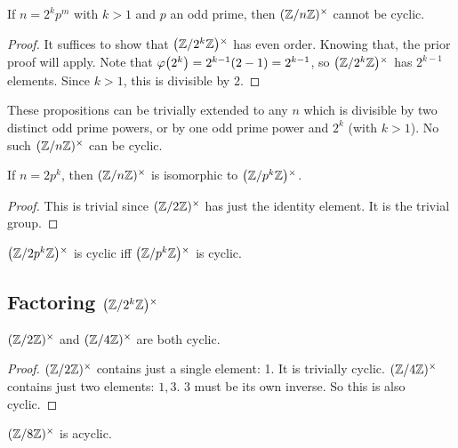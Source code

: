 \begin{proposition}
  If $n = 2^k p^m$ with $k > 1$ and $p$ an odd prime, then $\Zmodnx$
  cannot be cyclic.
\end{proposition}

\begin{proof}
  It suffices to show that $\Zmodx{2^k}$ has even order. Knowing that,
  the prior proof will apply. Note that $\vphif{2^k} = 2^{k-1}(2 - 1) =
  2^{k-1}$, so $\Zmodx{2^k}$ has $2^{k-1}$ elements. Since $k>1$, this
  is divisible by 2.
\end{proof}

\begin{remark}
  These propositions can be trivially extended to any $n$ which is
  divisible by two distinct odd prime powers, or by one odd prime power
  and $2^k$ (with $k > 1$). No such $\Zmodnx$ can be cyclic.
\end{remark}

\begin{proposition}
  If $n = 2 p^k$, then $\Zmodnx$ is isomorphic to $\Zmodx{p^k}$.
\end{proposition}

\begin{proof}
  This is trivial since $\Zmodx{2}$ has just the identity element. It is
  the trivial group.
\end{proof}

\begin{corollary}
  $\Zmodx{2 p^k}$ is cyclic iff $\Zmodx{p^k}$ is cyclic.
\end{corollary}

\subsection{Factoring $\Zmodx{2^k}$}

\begin{proposition}
  $\Zmodx{2}$ and $\Zmodx{4}$ are both cyclic.
\end{proposition}

\begin{proof}
  $\Zmodx{2}$ contains just a single element: 1. It is trivially cyclic.
  $\Zmodx{4}$ contains just two elements: $1, 3$. $3$ must be its own
  inverse. So this is also cyclic.
\end{proof}

\begin{proposition}
  $\Zmodx{8}$ is acyclic.
\end{proposition}

